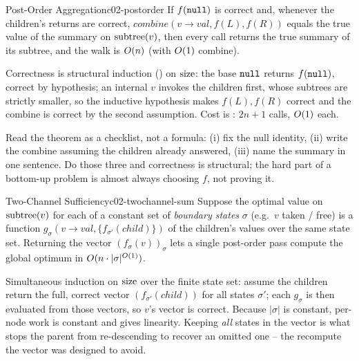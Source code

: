 \begin{theorem}{Post-Order Aggregation}{c02-postorder}
If $f(\texttt{null})$ is correct and, whenever the children's returns are correct,
$\mathit{combine}(v\to\mathit{val},f(L),f(R))$ equals the true value of the
summary on $\operatorname{subtree}(v)$, then every call returns the true summary of its subtree,
and the walk is $O(n)$ (with $O(1)$ combine).
\end{theorem}
\begin{proofbox}
Correctness is structural induction () on $\operatorname{size}$:
the base $\texttt{null}$ returns $f(\texttt{null})$, correct by hypothesis; an internal $v$ invokes
the children first, whose subtrees are strictly smaller, so the inductive
hypothesis makes $f(L),f(R)$ correct and the combine is correct by the second
assumption. Cost is : $2n+1$ calls, $O(1)$ each.
\end{proofbox}
\begin{insightbox}
Read the theorem as a checklist, not a formula: (i) fix the null identity,
(ii) write the combine assuming the children already answered, (iii) name the
summary in one sentence. Do those three and correctness is structural; the hard
part of a bottom-up problem is almost always choosing $f$, not proving it.
\end{insightbox}

\begin{theorem}{Two-Channel Sufficiency}{c02-twochannel-sum}
Suppose the optimal value on $\operatorname{subtree}(v)$ for each of a constant set of
\emph{boundary states} $\sigma$ (e.g.\ $v$ taken / free) is a function
$g_\sigma(v\to\mathit{val}, \{f_{\sigma'}(\mathit{child})\})$ of the children's
values over the same state set. Returning the vector $(f_\sigma(v))_\sigma$
lets a single post-order pass compute the global optimum in $O(n\cdot
|\sigma|^{O(1)})$.
\end{theorem}
\begin{proofbox}
Simultaneous induction on $\operatorname{size}$ over the finite state set: assume the children
return the full, correct vector $(f_{\sigma'}(\mathit{child}))$ for all states
$\sigma'$; each $g_\sigma$ is then evaluated from those vectors, so $v$'s vector
is correct. Because $|\sigma|$ is constant, per-node work is constant and
 gives linearity. Keeping \emph{all} states in the vector
is what stops the parent from re-descending to recover an omitted one -- the
recompute the vector was designed to avoid.
\end{proofbox}


